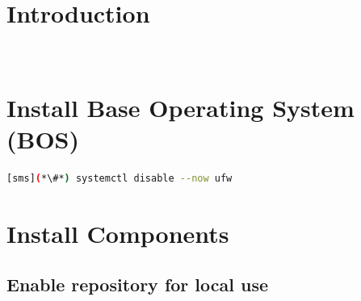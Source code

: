 \documentclass[letterpaper]{article}
\begin{document}
\graphicspath{{common/figures/}}
\thispagestyle{empty}




\newpage
\tableofcontents
\newpage


\section{Introduction} \label{sec:introduction}

 \\








\section{Install Base Operating System (BOS)}


\begin{lstlisting}[language=bash,keywords={}]
[sms](*\#*) systemctl disable --now ufw
\end{lstlisting}


\section{Install \OHPC{} Components} \label{sec:basic_install}


\subsection{Enable \OHPC{} repository for local use} \label{sec:enable_repo}



\end{document}
